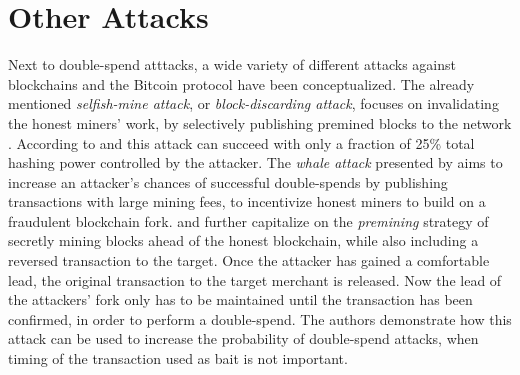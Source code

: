 \documentclass[a4paper,12pt,twoside]{report}
\begin{document}
\section{Other Attacks} \label{otherattacks}
Next to double-spend atttacks, a wide variety of different attacks against blockchains and the Bitcoin protocol have been conceptualized. The already mentioned \textit{selfish-mine attack}, or \textit{block-discarding attack}, focuses on invalidating the honest miners' work, by selectively publishing premined blocks to the network \cite{mwalemodel,selfishmine1,selfishmine2,lessThanHalfDraft}. According to \cite{lessThanHalfDraft} and \cite{selfishmine1} this attack can succeed with only a fraction of 25\% total hashing power controlled by the attacker. The \textit{whale attack} presented by \cite{whaleattack} aims to increase an attacker's chances of successful double-spends by publishing transactions with large mining fees, to incentivize honest miners to build on a fraudulent blockchain fork. \cite{premining1} and \cite{premining2} further capitalize on the \textit{premining} strategy of secretly mining blocks ahead of the honest blockchain, while also including a reversed transaction to the target. Once the attacker has gained a comfortable lead, the original transaction to the target merchant is released. Now the lead of the attackers' fork only has to be maintained until the transaction has been confirmed, in order to perform a double-spend. The authors demonstrate how this attack can be used to increase the probability of double-spend attacks, when timing of the transaction used as bait is not important.
\end{document}
